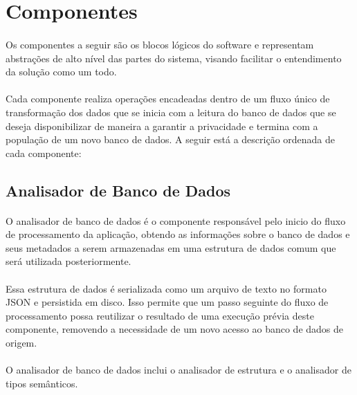 \section{Componentes}

\paragraph{} Os componentes a seguir são os blocos lógicos do software e representam abstrações de alto nível das partes do sistema, visando facilitar o entendimento da solução como um todo.

\paragraph{} Cada componente realiza operações encadeadas dentro de um fluxo único de transformação dos dados que se inicia com a leitura do banco de dados que se deseja disponibilizar de maneira a garantir a privacidade e termina com a população de um novo banco de dados. A seguir está a descrição ordenada de cada componente:

\subsection{Analisador de Banco de Dados}

\paragraph{} O analisador de banco de dados é o componente responsável pelo inicio do fluxo de processamento da aplicação, obtendo as informações sobre o banco de dados e seus metadados a serem armazenadas em uma estrutura de dados comum que será utilizada posteriormente.

\paragraph{} Essa estrutura de dados é serializada como um arquivo de texto no formato JSON e persistida em disco. Isso permite que um passo seguinte do fluxo de processamento possa reutilizar o resultado de uma execução prévia deste componente, removendo a necessidade de um novo acesso ao banco de dados de origem.

\paragraph{} O analisador de banco de dados inclui o analisador de estrutura e o analisador de tipos semânticos.

